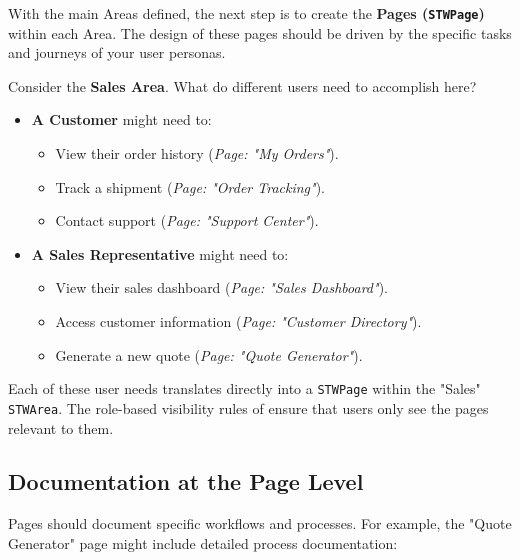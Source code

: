 With the main Areas defined, the next step is to create the \textbf{Pages (\texttt{STWPage})} within each Area. The design of these pages should be driven by the specific tasks and journeys of your user personas.

Consider the \textbf{Sales Area}. What do different users need to accomplish here?
\begin{itemize}
    \item \textbf{A Customer} might need to:
        \begin{itemize}
            \item View their order history (\textit{Page: "My Orders"}).
            \item Track a shipment (\textit{Page: "Order Tracking"}).
            \item Contact support (\textit{Page: "Support Center"}).
        \end{itemize}
    \item \textbf{A Sales Representative} might need to:
        \begin{itemize}
            \item View their sales dashboard (\textit{Page: "Sales Dashboard"}).
            \item Access customer information (\textit{Page: "Customer Directory"}).
            \item Generate a new quote (\textit{Page: "Quote Generator"}).
        \end{itemize}
\end{itemize}

Each of these user needs translates directly into a \texttt{STWPage} within the "Sales" \texttt{STWArea}. The role-based visibility rules of \wbdl{} ensure that users only see the pages relevant to them.

\subsection{Documentation at the Page Level}
\label{sec:page-documentation}

Pages should document specific workflows and processes. For example, the "Quote Generator" page might include detailed process documentation:

